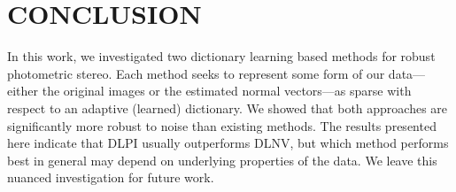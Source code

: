 \documentclass[9pt]{article}
\begin{document}
\vspace{-2mm}
\section{CONCLUSION} \label{sec:conclusion}
\vspace{-1mm}
In this work, we investigated two dictionary learning based methods for robust photometric stereo. Each method seeks to represent some form of our data---either the original images or the estimated normal vectors---as sparse with respect to an adaptive (learned) dictionary. We showed that both approaches are significantly more robust to noise than existing methods. The results presented here indicate that DLPI usually outperforms DLNV, but which method performs best in general may depend on underlying properties of the data. We leave this nuanced investigation for future work.


\ninept

\end{document}
